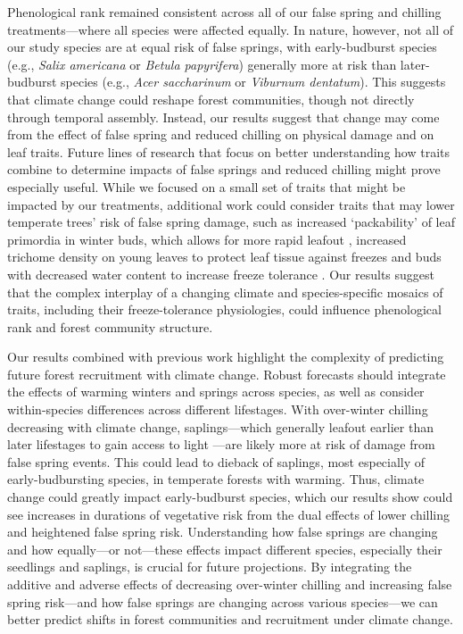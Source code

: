 \documentclass{article}\usepackage[]{graphicx}\usepackage[]{color}
\begin{document}
Phenological rank remained consistent across all of our false spring and chilling treatments---where all species were affected equally. In nature, however, not all of our study species are at equal risk of false springs, with early-budburst species (e.g., \textit{Salix americana} or \textit{Betula papyrifera}) generally more at risk than later-budburst species (e.g., \textit{Acer saccharinum} or \textit{Viburnum dentatum}). This suggests that climate change could reshape forest communities, though not directly through temporal assembly. Instead, our results suggest that change may come from the effect of false spring and reduced chilling on physical damage and on leaf traits. Future lines of research that focus on better understanding how traits combine to determine impacts of false springs and reduced chilling might prove especially useful. While we focused on a small set of traits that might be impacted by our treatments, additional work could consider traits that may lower temperate trees' risk of false spring damage, such as increased `packability' of leaf primordia in winter buds, which allows for more rapid leafout \citep{Edwards2017}, increased trichome density on young leaves to protect leaf tissue against freezes \citep{Agrawal2004, Prozherina2003} and buds with decreased water content to increase freeze tolerance \citep{Beck2007, Hofmann2015, Kathke2011, Morin2007,  Muffler2016, Nielsen2009, Poirier2010}. Our results suggest that the complex interplay of a changing climate and species-specific mosaics of traits, including their freeze-tolerance physiologies, could influence phenological rank and forest community structure. 

Our results combined with previous work highlight the complexity of predicting future forest recruitment with climate change. Robust forecasts should integrate the effects of warming winters and springs across species, as well as consider within-species differences across different lifestages. With over-winter chilling decreasing with climate change, saplings---which generally leafout earlier than later lifestages to gain access to light \citep{Augspurger2009}---are likely more at risk of damage from false spring events. This could lead to dieback of saplings, most especially of early-budbursting species, in temperate forests with warming. Thus, climate change could greatly impact early-budburst species, which our results show could see increases in durations of vegetative risk from the dual effects of lower chilling and heightened false spring risk. Understanding how false springs are changing and how equally---or not---these effects impact different species, especially their seedlings and saplings, is crucial for future projections. By integrating the additive and adverse effects of decreasing over-winter chilling and increasing false spring risk---and how false springs are changing across various species---we can better predict shifts in forest communities and recruitment under climate change. 
\end{document}

